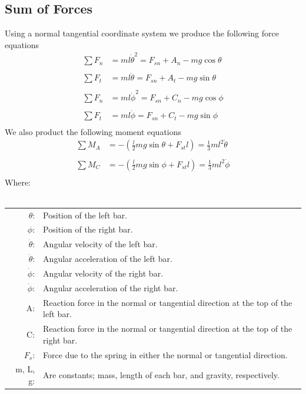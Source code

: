 \documentclass[12pt]{report}
\newcommand{\eqname}[1]{\tag*{#1}}%
\begin{document}
\begin{flushleft}
\section{Sum of Forces}
Using a normal tangential coordinate system we produce the following force equations
\begin{align}
  \sum F_n &= ml\dot{\theta}^2 = F_{sn} + A_n - mg\cos{\theta} \label{force_left_bar_theta_normal} \\ \eqname{Sum of Normal Forces on the left bar (Theta)} \\
  \sum F_t &= ml\dot{\theta} = F_{sn} + A_t- mg\sin{\theta} \label{force_left_bar_theta_tangential} \\ \eqname{Sum of Tangential Forces on the left bar (Theta)} \\
  \sum F_n &= ml\dot{\phi}^2 = F_{sn} + C_n - mg\cos{\phi} \label{force_right_bar_phi_normal} \\ \eqname{Sum of Normal Forces on the right bar (Phi)} \\
  \sum F_t &= ml\dot{\phi} = F_{sn} + C_t- mg\sin{\phi} \label{force_right_bar_phi_tangential} \\ \eqname{Sum of Tangential Forces on the right bar (Phi)}
\end{align}
We also product the following moment equations
\begin{align}
  \sum M_A &= -(\frac{l}{2}mg\sin{\theta}+F_{st}l) = \frac{1}{3}ml^2\dot{\theta} \label{moment_left_bar_theta} \\ \eqname{Sum of Moments about A (Theta)} \\
  \sum M_C &= -(\frac{l}{2}mg\sin{\phi}+F_{st}l) = \frac{1}{3}ml^2\dot{\phi} \label{moment_right_bar_theta} \\ \eqname{Sum of Moments about C (Phi)}
\end{align}
Where: \\
~\\
\begin{tabular}{rl}
$\theta$:& Position of the left bar. \\
$\phi$:& Position of the right bar. \\
$\dot{\theta}$:& Angular velocity of the left bar. \\
$\ddot{\theta}$:& Angular acceleration of the left bar. \\
$\dot{\phi}$:& Angular velocity of the right bar. \\
$\ddot{\phi}$:& Angular acceleration of the right bar. \\
A:& Reaction force in the normal or tangential direction at the top of the left bar. \\
C:& Reaction force in the normal or tangential direction at the top of the right bar. \\
$F_s$:& Force due to the spring in either the normal or tangential direction. \\
m, L, g: & Are constants; mass, length of each bar, and gravity, respectively.
\end{tabular}

\end{flushleft}
\end{document}
